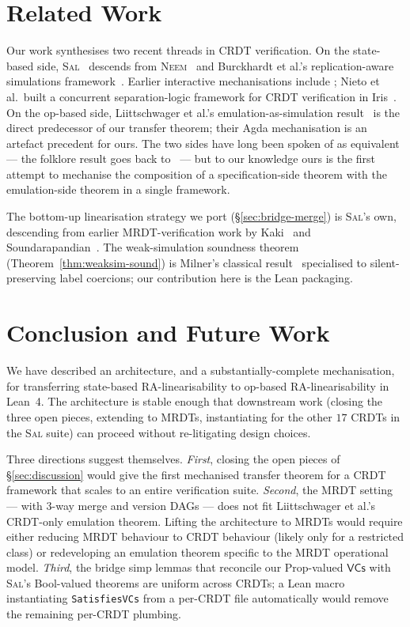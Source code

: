 \documentclass[11pt,a4paper]{article}
\theoremstyle{definition}
\theoremstyle{remark}
\newcommand{\VCs}{\mathsf{VCs}}
\newcommand{\Sal}{\textsc{Sal}}
\begin{document}
\section{Related Work}
\label{sec:related}

Our work synthesises two recent threads in CRDT verification. On
the state-based side, \Sal{}~\cite{sal2025} descends from
\textsc{Neem}~\cite{neem2025} and Burckhardt et
al.'s replication-aware simulations framework~\cite{burckhardt-rdts-svo}.
Earlier interactive mechanisations include
\cite{zeller-state-based,gomes-verifying-sec}; Nieto et al.\ built
a concurrent separation-logic framework for CRDT verification in
Iris~\cite{nieto-aneris-state-based,timany-trillium}.
On the op-based side, Liittschwager et al.'s emulation-as-simulation
result~\cite{liittschwager2025} is the direct predecessor of our
transfer theorem; their Agda mechanisation is an artefact precedent
for ours. The two sides have long been spoken of as equivalent ---
the folklore result goes back to~\cite{shapiro-crdts} --- but to our
knowledge ours is the first attempt to mechanise the composition of
a specification-side theorem with the emulation-side theorem in a
single framework.

The bottom-up linearisation strategy we port
(\S\ref{sec:bridge-merge}) is \Sal{}'s own, descending from
earlier MRDT-verification work by Kaki~\cite{kaki2022} and
Soundarapandian~\cite{vimala-mrdts}. The weak-simulation soundness
theorem (Theorem~\ref{thm:weaksim-sound}) is Milner's classical
result~\cite{milner-ccs} specialised to silent-preserving label
coercions; our contribution here is the Lean packaging.

\section{Conclusion and Future Work}
\label{sec:conclusion}

We have described an architecture, and a substantially-complete
mechanisation, for transferring state-based RA-linearisability to
op-based RA-linearisability in Lean~4. The architecture is stable
enough that downstream work (closing the three open pieces,
extending to MRDTs, instantiating for the other $17$ CRDTs in the
\Sal{} suite) can proceed without re-litigating design choices.

Three directions suggest themselves.
\emph{First}, closing the open pieces of \S\ref{sec:discussion}
would give the first mechanised transfer theorem for a CRDT
framework that scales to an entire verification suite.
\emph{Second}, the MRDT setting --- with $3$-way merge and version
DAGs --- does not fit Liittschwager et al.'s CRDT-only emulation
theorem. Lifting the architecture to MRDTs would require either
reducing MRDT behaviour to CRDT behaviour (likely only for a
restricted class) or redeveloping an emulation theorem specific to
the MRDT operational model.
\emph{Third}, the bridge simp lemmas that reconcile our Prop-valued
$\VCs$ with \Sal{}'s Bool-valued theorems are uniform across
CRDTs; a Lean macro instantiating \texttt{SatisfiesVCs} from a
per-CRDT file automatically would remove the remaining per-CRDT
plumbing.
\end{document}
